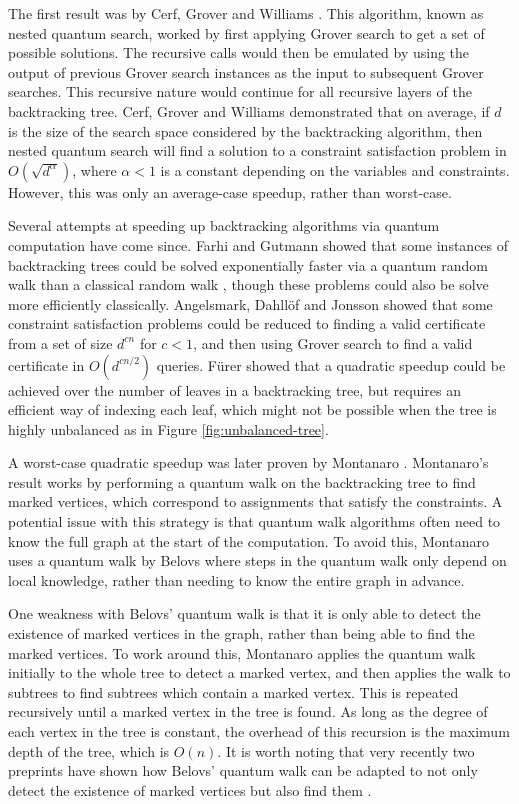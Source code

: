 The first result was by Cerf, Grover and Williams \cite{cerf2000}. This algorithm, known as nested quantum search, worked by first applying Grover search to get a set of possible solutions. The recursive calls would then be emulated by using the output of previous Grover search instances as the input to subsequent Grover searches. This recursive nature would continue for all recursive layers of the backtracking tree. Cerf, Grover and Williams demonstrated that on average, if $d$ is the size of the search space considered by the backtracking algorithm, then nested quantum search will find a solution to a constraint satisfaction problem in $O(\sqrt{d^\alpha})$, where $\alpha<1$ is a constant depending on the variables and constraints. However, this was only an average-case speedup, rather than worst-case.

Several attempts at speeding up backtracking algorithms via quantum computation have come since. Farhi and Gutmann \cite{farhi1998} showed that some instances of backtracking trees could be solved exponentially faster via a quantum random walk than a classical random walk \cite{farhi1998}, though these problems could also be solve more efficiently classically. Angelsmark, Dahll{\"o}f and Jonsson showed that some constraint satisfaction problems could be reduced to finding a valid certificate from a set of size $d^{cn}$ for $c<1$, and then using Grover search to find a valid certificate in $O(d^{cn/2})$ queries. F\"{u}rer \cite{furer2008} showed that a quadratic speedup could be achieved over the number of leaves in a backtracking tree, but requires an efficient way of indexing each leaf, which might not be possible when the tree is highly unbalanced as in Figure \ref{fig:unbalanced-tree}.

A worst-case quadratic speedup was later proven by Montanaro \cite{montanaro2015}. Montanaro's result works by performing a quantum walk on the backtracking tree to find marked vertices, which correspond to assignments that satisfy the constraints. A potential issue with this strategy is that quantum walk algorithms often need to know the full graph at the start of the computation. To avoid this, Montanaro uses a quantum walk by Belovs \cite{belovs2013,belovs13a} where steps in the quantum walk only depend on local knowledge, rather than needing to know the entire graph in advance.

One weakness with Belovs' quantum walk is that it is only able to detect the existence of marked vertices in the graph, rather than being able to find the marked vertices. To work around this, Montanaro applies the quantum walk initially to the whole tree to detect a marked vertex, and then applies the walk to subtrees to find subtrees which contain a marked vertex. This is repeated recursively until a marked vertex in the tree is found. As long as the degree of each vertex in the tree is constant, the overhead of this recursion is the maximum depth of the tree, which is $O(n)$. It is worth noting that very recently two preprints have shown how Belovs' quantum walk can be adapted to not only detect the existence of marked vertices but also find them \cite{apers2019, piddock2019}.


